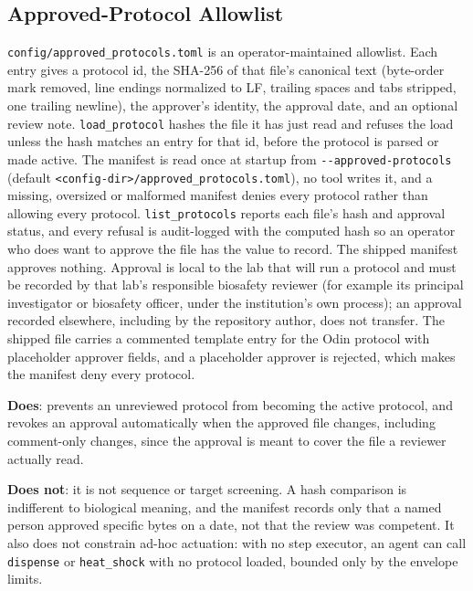 \documentclass[11pt,letterpaper]{article}
\begin{document}
\subsection{Approved-Protocol Allowlist}
\label{sec:allowlist}

\texttt{config/approved\_protocols.toml} is an operator-maintained allowlist. Each entry gives a protocol id, the SHA-256 of that file's canonical text (byte-order mark removed, line endings normalized to LF, trailing spaces and tabs stripped, one trailing newline), the approver's identity, the approval date, and an optional review note. \texttt{load\_protocol} hashes the file it has just read and refuses the load unless the hash matches an entry for that id, before the protocol is parsed or made active. The manifest is read once at startup from \texttt{-{}-approved-protocols} (default \texttt{<config-dir>/approved\_protocols.toml}), no tool writes it, and a missing, oversized or malformed manifest denies every protocol rather than allowing every protocol. \texttt{list\_protocols} reports each file's hash and approval status, and every refusal is audit-logged with the computed hash so an operator who does want to approve the file has the value to record. The shipped manifest approves nothing. Approval is local to the lab that will run a protocol and must be recorded by that lab's responsible biosafety reviewer (for example its principal investigator or biosafety officer, under the institution's own process); an approval recorded elsewhere, including by the repository author, does not transfer. The shipped file carries a commented template entry for the Odin protocol with placeholder approver fields, and a placeholder approver is rejected, which makes the manifest deny every protocol.

\begin{safetybox}
\textbf{Does}: prevents an unreviewed protocol from becoming the active protocol, and revokes an approval automatically when the approved file changes, including comment-only changes, since the approval is meant to cover the file a reviewer actually read.

\textbf{Does not}: it is not sequence or target screening. A hash comparison is indifferent to biological meaning, and the manifest records only that a named person approved specific bytes on a date, not that the review was competent. It also does not constrain ad-hoc actuation: with no step executor, an agent can call \texttt{dispense} or \texttt{heat\_shock} with no protocol loaded, bounded only by the envelope limits.
\end{safetybox}
\end{document}
